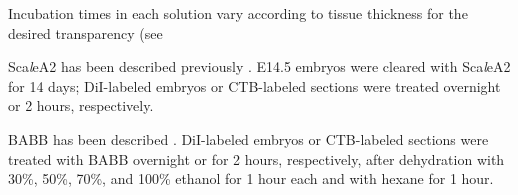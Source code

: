 Incubation times in each solution vary according to tissue thickness for the desired transparency (see %

Sca\emph{l}eA2 has been described previously \cite{hama2011scale}.
E14.5 embryos were cleared with Sca\emph{l}eA2 for 14 days; DiI-labeled embryos or CTB-labeled sections were treated overnight or 2 hours, respectively.

BABB has been described \cite{dodt2007ultramicroscopy}.
DiI-labeled embryos or CTB-labeled sections were treated with BABB overnight or for 2 hours, respectively, after dehydration with 30\%, 50\%, 70\%, and 100\% ethanol for 1 hour each and with hexane for 1 hour.
